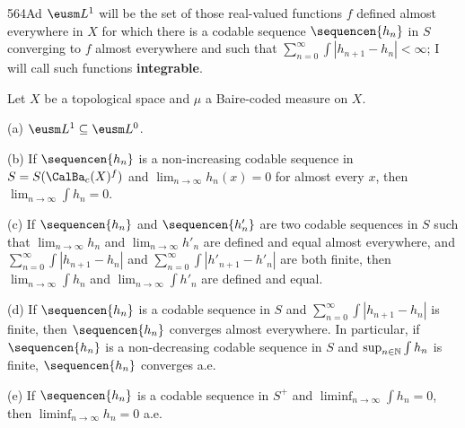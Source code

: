 \spheader 564Ad $\eusm L^1$ will be the set of those real-valued
functions $f$ defined almost everywhere in $X$ for
which there is a codable sequence $\sequencen{h_n}$ in
$S$ converging to $f$ almost everywhere and such that
$\sum_{n=0}^{\infty}\int|h_{n+1}-h_n|<\infty$;  I will call such functions
{\bf integrable}.

 Let $X$ be a topological space and $\mu$ a
Baire-coded measure on $X$.

(a) $\eusm L^1\subseteq\eusm L^0$.

(b) If $\sequencen{h_n}$ is a non-increasing codable sequence in
$S=S(\CalBa_c(X)^f)$ and
$\lim_{n\to\infty}h_n(x)=0$ for almost every $x$, then
$\lim_{n\to\infty}\int h_n=0$.

(c) If $\sequencen{h_n}$ and $\sequencen{h'_n}$ are two codable
sequences in
$S$ such that $\lim_{n\to\infty}h_n$ and $\lim_{n\to\infty}h'_n$
are defined and equal almost everywhere, and
$\sum_{n=0}^{\infty}\int|h_{n+1}-h_n|$
and $\sum_{n=0}^{\infty}\int|h'_{n+1}-h'_n|$ are both finite, then
$\lim_{n\to\infty}\int h_n$ and $\lim_{n\to\infty}\int h'_n$ are defined
and equal.

(d) If $\sequencen{h_n}$ is a codable sequence in $S$ and
$\sum_{n=0}^{\infty}\int|h_{n+1}-h_n|$ is finite, then
$\sequencen{h_n}$ converges almost everywhere.   In particular, if
$\sequencen{h_n}$ is a non-decreasing codable sequence in $S$ and
$\sup_{n\in\Bbb N}\int h_n$ is finite, $\sequencen{h_n}$ converges a.e.

(e) If $\sequencen{h_n}$ is a codable sequence in $S^+$ and
$\liminf_{n\to\infty}\int h_n=0$, then $\liminf_{n\to\infty}h_n=0$ a.e.

